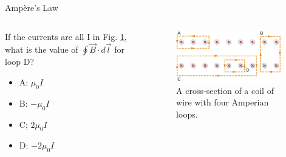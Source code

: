 \documentclass{beamer}
\begin{document}
\begin{frame}{Amp\`{e}re's Law}
\begin{columns}[T]
\begin{column}{0.5\textwidth}
\small
If the currents are all I in Fig. \ref{fig:ampQuestion2}, what is the value of $\oint \vec{B} \cdot d\vec{l}$ for loop D?
\begin{itemize}
\item A: $\mu_0 I$
\item B: $-\mu_0 I$
\item C; $2\mu_0 I$
\item D: $-2\mu_0 I$
\end{itemize}
\end{column}
\begin{column}{0.5\textwidth}
\begin{figure}
\centering
\includegraphics[width=0.95\textwidth]{figures/ampQuestion1.jpeg}
\caption{\label{fig:ampQuestion2} A cross-section of a coil of wire with four Amperian loops.}
\end{figure}
\end{column}
\end{columns}
\end{frame}
\end{document}
